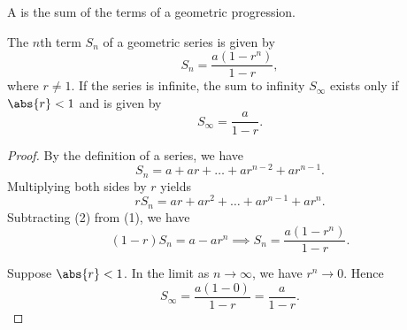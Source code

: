 \begin{definition}
    A  is the sum of the terms of a geometric progression.
\end{definition}

\begin{proposition}
    The $n$th term $S_n$ of a geometric series is given by \[S_n = \frac{a(1 - r^n)}{1 - r},\] where $r \neq 1$. If the series is infinite, the sum to infinity $S_\infty$ exists only if $\abs{r} < 1$ and is given by \[S_\infty = \frac{a}{1 - r}.\]
\end{proposition}
\begin{proof}
    By the definition of a series, we have \[S_n = a + ar + \dots + ar^{n-2} + ar^{n-1}. \tag{1}\] Multiplying both sides by $r$ yields \[r S_n = ar + ar^2 + \dots + ar^{n-1} + ar^{n}. \tag{2}\] Subtracting (2) from (1), we have \[(1-r)S_n = a - ar^{n} \implies S_n = \frac{a(1 - r^{n})}{1 - r}.\]
    
    Suppose $\abs{r} < 1$. In the limit as $n \to \infty$, we have $r^n \to 0$. Hence \[S_\infty = \frac{a(1 - 0)}{1 - r} = \frac{a}{1-r}.\]
\end{proof}